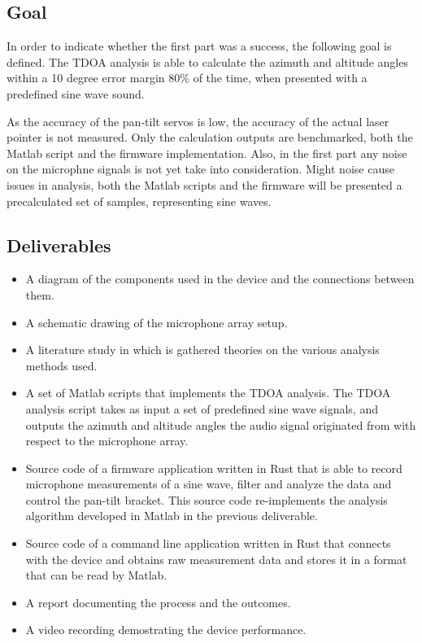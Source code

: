 \documentclass[a4paper]{article}
\begin{document}
\subsection{Goal}
In order to indicate whether the first part was a success, the following goal is defined. The TDOA analysis is able to calculate the azimuth and altitude angles within a 10 degree error margin 80\% of the time, when presented with a predefined sine wave sound. 

As the accuracy of the pan-tilt servos is low, the accuracy of the actual laser pointer is not measured. Only the calculation outputs are benchmarked, both the Matlab script and the firmware implementation. Also, in the first part any noise on the microphne signals is not yet take into consideration. Might noise cause issues in analysis, both the Matlab scripts and the firmware will be presented a precalculated set of samples, representing sine waves.

\subsection{Deliverables}
\begin{itemize}
    \item A diagram of the components used in the device and the connections between them.
    \item A schematic drawing of the microphone array setup.
    \item A literature study in which is gathered theories on the various analysis methods used.
    \item A set of Matlab scripts that implements the TDOA analysis. The TDOA analysis script takes as input a set of predefined sine wave signals, and outputs the azimuth and altitude angles the audio signal originated from with respect to the microphone array.
    \item Source code of a firmware application written in Rust that is able to record microphone measurements of a sine wave, filter and analyze the data and control the pan-tilt bracket. This source code re-implements the analysis algorithm developed in Matlab in the previous deliverable.
    \item Source code of a command line application written in Rust that connects with the device and obtains raw measurement data and stores it in a format that can be read by Matlab.
    \item A report documenting the process and the outcomes.
    \item A video recording demostrating the device performance.
\end{itemize}
\end{document}
